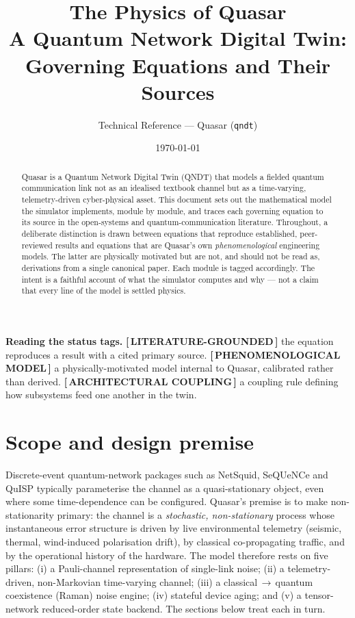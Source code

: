 \documentclass[11pt]{article}
\title{\vspace{-1.2cm}\textbf{\color{quasarblue}The Physics of Quasar}\\[2pt]
\large A Quantum Network Digital Twin: Governing Equations and Their Sources}
\author{Technical Reference --- Quasar (\texttt{qndt})}
\date{\today}
\newcommand{\statusVerified}{\textbf{\color{verified}[\,LITERATURE-GROUNDED\,]}}
\newcommand{\statusPhenom}{\textbf{\color{phenom}[\,PHENOMENOLOGICAL MODEL\,]}}
\newcommand{\statusArch}{\textbf{\color{architect}[\,ARCHITECTURAL COUPLING\,]}}
\begin{document}
\maketitle
\vspace{-0.7cm}

\begin{abstract}
\noindent Quasar is a Quantum Network Digital Twin (QNDT) that models a fielded quantum
communication link not as an idealised textbook channel but as a time-varying,
telemetry-driven cyber-physical asset. This document sets out the mathematical model
the simulator implements, module by module, and traces each governing equation to its
source in the open-systems and quantum-communication literature. Throughout, a
deliberate distinction is drawn between equations that reproduce established, peer-reviewed
results and equations that are Quasar's own \emph{phenomenological} engineering models.
The latter are physically motivated but are not, and should not be read as, derivations
from a single canonical paper. Each module is tagged accordingly. The intent is a
faithful account of what the simulator computes and why --- not a claim that every line
of the model is settled physics.
\end{abstract}

\noindent\textbf{Reading the status tags.}\quad
\statusVerified{} the equation reproduces a result with a cited primary source.\;
\statusPhenom{} a physically-motivated model internal to Quasar, calibrated rather than derived.\;
\statusArch{} a coupling rule defining how subsystems feed one another in the twin.

\section{Scope and design premise}
Discrete-event quantum-network packages such as NetSquid, SeQUeNCe and QuISP typically
parameterise the channel as a quasi-stationary object, even where some time-dependence can be
configured. Quasar's premise is to make non-stationarity primary: the channel is a \emph{stochastic, non-stationary} process whose instantaneous
error structure is driven by live environmental telemetry (seismic, thermal, wind-induced
polarisation drift), by classical co-propagating traffic, and by the operational history of
the hardware. The model therefore rests on five pillars: (i) a Pauli-channel representation
of single-link noise; (ii) a telemetry-driven, non-Markovian time-varying channel;
(iii) a classical$\,\to\,$quantum coexistence (Raman) noise engine; (iv) stateful device aging;
and (v) a tensor-network reduced-order state backend. The sections below treat each in turn.
\end{document}
